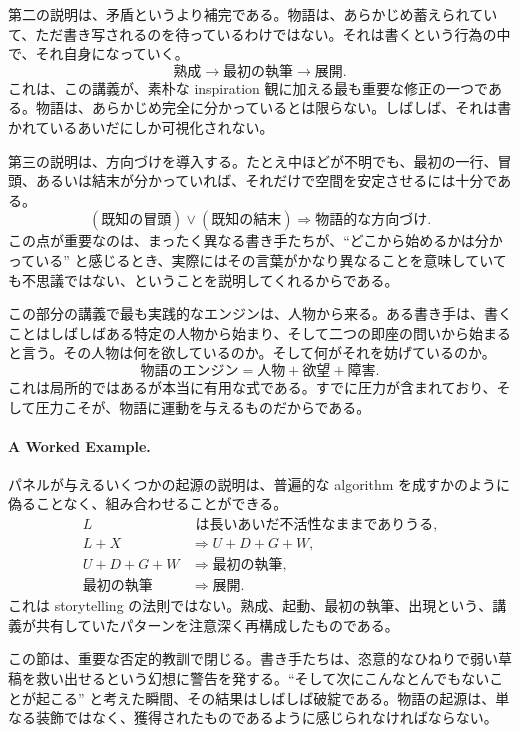 第二の説明は、矛盾というより補完である。物語は、あらかじめ蓄えられていて、ただ書き写されるのを待っているわけではない。それは書くという行為の中で、それ自身になっていく。
\begin{equation}
\text{熟成} \to \text{最初の執筆} \to \text{展開}.
\end{equation}
これは、この講義が、素朴な inspiration 観に加える最も重要な修正の一つである。物語は、あらかじめ完全に分かっているとは限らない。しばしば、それは書かれているあいだにしか可視化されない。

第三の説明は、方向づけを導入する。たとえ中ほどが不明でも、最初の一行、冒頭、あるいは結末が分かっていれば、それだけで空間を安定させるには十分である。
\begin{equation}
(\text{既知の冒頭}) \lor (\text{既知の結末}) \Rightarrow \text{物語的な方向づけ}.
\end{equation}
この点が重要なのは、まったく異なる書き手たちが、``どこから始めるかは分かっている'' と感じるとき、実際にはその言葉がかなり異なることを意味していても不思議ではない、ということを説明してくれるからである。

この部分の講義で最も実践的なエンジンは、人物から来る。ある書き手は、書くことはしばしばある特定の人物から始まり、そして二つの即座の問いから始まると言う。その人物は何を欲しているのか。そして何がそれを妨げているのか。
\begin{equation}
\text{物語のエンジン} = \text{人物} + \text{欲望} + \text{障害}.
\end{equation}
これは局所的ではあるが本当に有用な式である。すでに圧力が含まれており、そして圧力こそが、物語に運動を与えるものだからである。

\paragraph{A Worked Example.} パネルが与えるいくつかの起源の説明は、普遍的な algorithm を成すかのように偽ることなく、組み合わせることができる。
\begin{align}
L &\text{ は長いあいだ不活性なままでありうる},\\
L + X &\Rightarrow U + D + G + W,\\
U + D + G + W &\Rightarrow \text{最初の執筆},\\
\text{最初の執筆} &\Rightarrow \text{展開}.
\end{align}
これは storytelling の法則ではない。熟成、起動、最初の執筆、出現という、講義が共有していたパターンを注意深く再構成したものである。

この節は、重要な否定的教訓で閉じる。書き手たちは、恣意的なひねりで弱い草稿を救い出せるという幻想に警告を発する。``そして次にこんなとんでもないことが起こる'' と考えた瞬間、その結果はしばしば破綻である。物語の起源は、単なる装飾ではなく、獲得されたものであるように感じられなければならない。

